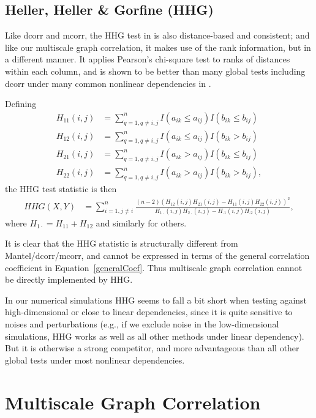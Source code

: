 \documentclass[11pt]{article}
\begin{document}
\subsection{Heller, Heller \& Gorfine (HHG)}
\label{appen:hhg}
Like dcorr and mcorr, the HHG test in \cite{HellerGorfine2013} is also distance-based and consistent; and like our multiscale graph correlation, it makes use of the rank information, but in a different manner. It applies Pearson's chi-square test to ranks of distances within each column, and is shown to be better than many global tests including dcorr under many common nonlinear dependencies in \cite{GorfineHellerHeller2012, HellerGorfine2013}. 

Defining 
\begin{align*}
H_{11}(i,j) &= \sum_{q=1,q\neq i,j}^{n}I(a_{ik} \leq a_{ij})I(b_{ik} \leq b_{ij}) \\
H_{12}(i,j) &= \sum_{q=1,q\neq i,j}^{n}I(a_{ik} \leq a_{ij})I(b_{ik} > b_{ij}) \\
H_{21}(i,j) &= \sum_{q=1,q\neq i,j}^{n}I(a_{ik} > a_{ij})I(b_{ik} \leq b_{ij}) \\
H_{22}(i,j) &= \sum_{q=1,q\neq i,j}^{n}I(a_{ik} > a_{ij})I(b_{ik} > b_{ij}),
\end{align*}
the HHG test statistic is then
\begin{align*}
HHG(X,Y) &= \sum_{i=1,j\neq i}^{n} \frac{(n-2)(H_{12}(i,j)H_{21}(i,j)-H_{11}(i,j)H_{22}(i,j))^2}{H_{1 \cdot}(i,j)H_{2 \cdot}(i,j)-H_{\cdot 1}(i,j)H_{\cdot 2}(i,j)},
\end{align*}
where $H_{1 \cdot}=H_{11}+H_{12}$ and similarly for others.

It is clear that the HHG statistic is structurally different from Mantel/dcorr/mcorr, and cannot be expressed in terms of the general correlation coefficient in Equation~\ref{generalCoef}. Thus multiscale graph correlation cannot be directly implemented by HHG.

In our numerical simulations HHG seems to fall a bit short when testing against high-dimensional or close to linear dependencies, since it is quite sensitive to noises and perturbations (e.g., if we exclude noise in the low-dimensional simulations, HHG works as well as all other methods under linear dependency). But it is otherwise a strong competitor, and more advantageous than all other global tests under most nonlinear dependencies. %

\section{Multiscale Graph Correlation}
\label{appen:MGC}
\end{document}
